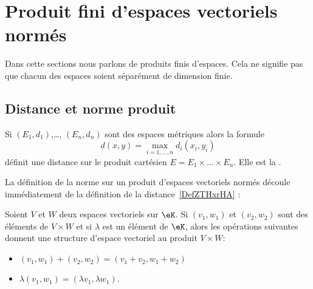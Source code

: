 
\section{Produit fini d'espaces vectoriels normés}
\label{sec_prod}

Dans cette sections nous parlons de produits finis d'espaces. Cela ne signifie pas que chacun des espaces soient séparément de dimension finie.

\subsection{Distance et norme produit}

\begin{propositionDef}    \label{DefZTHxrHA}
    Si \( (E_1,d_1)\),\ldots, \( (E_n,d_n)\) sont des espaces métriques alors la formule
    \begin{equation} 
        d(x,y)=\max_{i=1,\ldots, n}d_i(x_i,y_i)
    \end{equation}
    définit une distance sur le produit cartésien \( E=E_1\times\ldots\times E_n\). Elle est la .
\end{propositionDef}

La définition de la norme sur un produit d'espaces vectoriels normés découle immédiatement de la définition de la distance~\ref{DefZTHxrHA} :
\begin{lemmaDef}  \label{DefFAJgTCE}
    Soient $V$ et $W$ deux espaces vectoriels sur \( \eK\). Si \( (v_1,w_1)\) et \( (v_2,w_2)\) sont des éléments de \( V\times W\) et si \( \lambda\) est un élément de \( \eK\), alors les opérations suivantes donnent une structure d'espace vectoriel au produit \( V\times W\):
    \begin{itemize}
        \item \( (v_1,w_1)+(v_2,w_2)=(v_1+v_2,w_1+w_2)\)
        \item \( \lambda(v_1,w_1)=(\lambda v_1,\lambda w_1)\).
    \end{itemize}
\end{lemmaDef}

